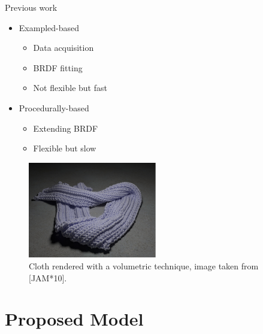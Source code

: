 \documentclass{beamer}
\begin{document}
\begin{frame}{Previous work}

\begin{multicols}{2}

\begin{itemize}
\setlength\itemsep{0.5em}
\item Exampled-based
		\begin{itemize}
		\setlength\itemsep{0.5em}
		\item Data acquisition
		\item BRDF fitting
		\item Not flexible but fast
		\end{itemize}
\item Procedurally-based
		\begin{itemize}
		\setlength\itemsep{0.5em}
		\item Extending BRDF
		\item Flexible but slow
		\end{itemize}
\end{itemize}

\begin{figure}[t!]
\begin{center}
\includegraphics[width=0.5\textwidth]{img/volumetricCloth} 
\caption*{\tiny{Cloth rendered with a volumetric technique, image taken from [JAM*10].}}
\end{center}
\end{figure}
\end{multicols}



\end{frame}

\section{Proposed Model}
\end{document}
